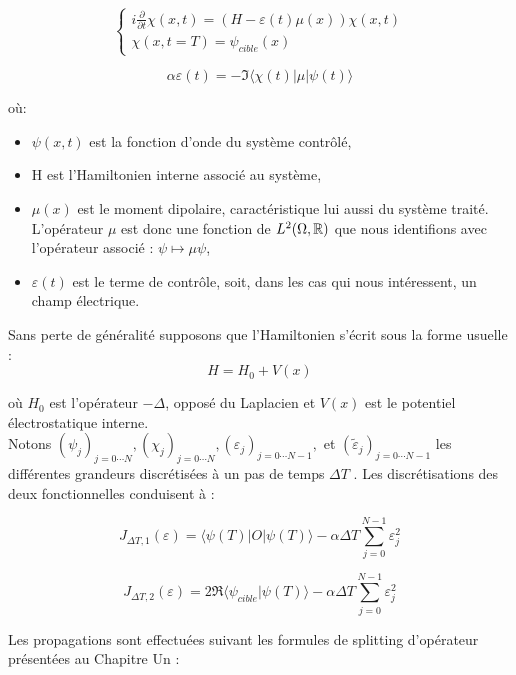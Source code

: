 \begin{equation}
\begin{cases}
i \frac{\partial}{\partial t} \chi (x,t) = (H - \varepsilon(t)\mu(x))\chi(x,t)\\
\chi(x,t=T)=\psi_{cible}(x)
\end{cases}
\end{equation}

\begin{equation}
\alpha\varepsilon(t) = -\Im \langle \chi(t)|\mu|\psi(t)\rangle 
\end{equation}

où:
\begin{itemize}
	\item $\psi(x, t)$ est la fonction d'onde du système contrôlé,
	\item H est l'Hamiltonien interne associé au système,
	\item $\mu(x)$ est le moment dipolaire, caractéristique lui aussi du système traité. L'opérateur $\mu$ est donc une fonction de $L^2(\Omega, \mathbb R)$ que nous identifions avec l'opérateur associé : $\psi \mapsto \mu\psi$,
	\item $\varepsilon(t)$ est le terme de contrôle, soit, dans les cas qui nous intéressent, un champ
	électrique.
\end{itemize}

Sans perte de généralité supposons que l’Hamiltonien s'écrit sous la forme usuelle :
$$ H = H_0+V(x)$$

où $H_0$ est l'opérateur $-\Delta$, opposé du Laplacien et $V(x)$ est le potentiel électrostatique interne.\\

Notons $(\psi_j)_{j = 0\cdots N}, (\chi_j)_{j = 0\cdots N}, (\varepsilon_j)_{j = 0\cdots N-1}, $ et $(\tilde{\varepsilon}_j)_{j = 0\cdots N-1}$ les différentes grandeurs discrétisées à un pas de temps $\Delta T$ . Les discrétisations des deux fonctionnelles conduisent à :

\begin{equation}
J_{\Delta T,1}(\varepsilon) = \langle \psi(T)|O|\psi(T)\rangle - \alpha \Delta T \sum_{j=0}^{N -1} \varepsilon_j^2
\end{equation}

\begin{equation}
J_{\Delta T,2}(\varepsilon) = 2\Re \langle \psi_{cible}|\psi(T)\rangle - \alpha \Delta T \sum_{j=0}^{N -1} \varepsilon_j^2
\end{equation}

Les propagations sont effectuées suivant les formules de splitting d'opérateur présentées au Chapitre Un :

